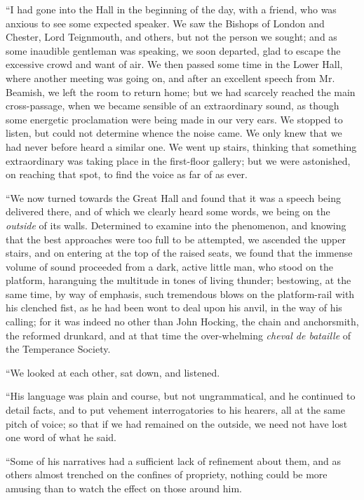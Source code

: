 ``I
had gone into the Hall in the beginning of the day, with a friend, who
was anxious to see some expected speaker. We saw the Bishops of London
and Chester, Lord Teignmouth, and others, but not the person we sought;
and as some inaudible gentleman was speaking, we soon departed, glad to
escape the excessive crowd and want of air. We then passed some time in
the Lower Hall, where another meeting was going on, and after an
excellent speech from Mr. Beamish, we left the room to return home; but
we had scarcely reached the main cross-passage, when we became sensible
of an extraordinary sound, as though some energetic proclamation were
being made in our very ears. We stopped to listen, but could not
determine whence the noise came. We only knew that we had never before
heard a similar one. We went up stairs, thinking that something
extraordinary was taking place in the first-floor gallery; but we were
astonished, on reaching that spot, to find the voice as far of as ever.

``We
now turned towards the Great Hall and found that it was a speech being
delivered there, and of which we clearly heard some words, we being on
the \emph{outside} of its walls. Determined to examine into the
phenomenon, and knowing that the best approaches were too full to be
attempted, we ascended the upper stairs, and on entering at the top of
the raised seats, we found that the immense volume of sound proceeded
from a dark, active little man, who stood on the platform, haranguing
the multitude in tones of living thunder; bestowing, at the same time,
by way of emphasis, such tremendous blows on the platform-rail with his
clenched fist, as he had been wont to deal upon his anvil, in the way of
his calling; for it was indeed no other than John Hocking, the chain and
anchorsmith, the reformed drunkard, and at that time the over-whelming \emph{cheval
de bataille} of the Temperance Society.

``We
looked at each other, sat down, and listened.

``His
language was plain and course, but not ungrammatical, and he continued
to detail facts, and to put vehement interrogatories to his hearers, all
at the same pitch of voice; so that if we had remained on the outside,
we need not have lost one word of what he said.

``Some
of his narratives had a sufficient lack of refinement about them, and as
others almost trenched on the confines of propriety, nothing could be
more amusing than to watch the effect on those around him.

